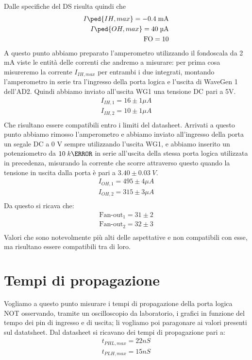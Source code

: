 \documentclass[10pt, a4paper, italian]{article}
\begin{document}
Dalle specifiche del DS risulta quindi che 
\begin{align*}
    I\ped{IH, max}= -0.4 \; \si{m\A} \\
    I\ped{OH, max}= 40 \; \si{\micro\A} \\
    \text{FO} = 10
\end{align*}
A questo punto abbiamo preparato l'amperometro utilizzando il fondoscala da 2 mA viste le entità delle correnti che andremo a misurare: per prima cosa misureremo la corrente $I_{IH,max}$ per entrambi i due integrati, montando l'amperometro in serie tra l'ingresso della porta logica e l'uscita di WaveGen 1 dell'AD2. Quindi abbiamo inviato all'uscita WG1 una tensione DC pari a 5V.
\begin{gather*}
    I_{IH,1}=16 \pm 1 \mu A\\
    I_{IH,2}=10 \pm 1 \mu A\\   
\end{gather*}
Che risultano essere compatibili entro i limiti del datasheet.
Arrivati a questo punto abbiamo rimosso l'amperometro e abbiamo inviato all'ingresso della porta un segale DC a 0 V sempre utilizzando l'uscita WG1, e abbiamo inserito un potenziometro da $10 \; k\ohm$ in serie all'uscita della stessa porta logica utilizzata in precedenza, misurando la corrente che scorre attraverso questo quando la tensione in uscita dalla porta è pari a $3.40 \pm 0.03 \; V$.
\begin{gather*}
    I_{OH,1}=495 \pm 4 \mu A\\
    I_{OH,2}=315 \pm 3 \mu A\\   
\end{gather*}
Da questo si ricava che:
\begin{gather*}
    \mbox{Fan-out}_1=31 \pm 2\\
    \mbox{Fan-out}_2=32 \pm 3\\
\end{gather*}
Valori che sono notevolmente più alti delle aspettative e non compatibili con esse, ma risultano essere compatibili tra di loro.

\section{Tempi di propagazione}
Vogliamo a questo punto misurare i tempi di propagazione della porta logica NOT osservando, tramite un oscilloscopio da laboratorio, i grafici in funzione del tempo dei pin di ingresso e di uscita; li vogliamo poi paragonare ai valori presenti sul datatsheet.
Dal datasheet si ricavano dei tempi di propagazione pari a:
\begin{gather*}
    t_{PHL,max}=22 nS\\
    t_{PLH,max}=15 nS\\
\end{gather*}
\end{document}
